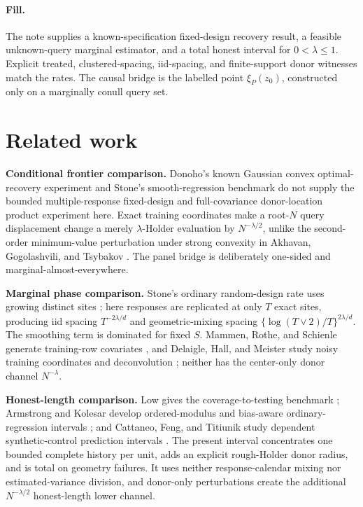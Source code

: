 \documentclass{article}
\begin{document}
\paragraph{Fill.} The note supplies a known-specification fixed-design recovery result, a feasible unknown-query marginal estimator, and a total honest interval for \(0<\lambda\le1\). Explicit treated, clustered-spacing, iid-spacing, and finite-support donor witnesses match the rates. The causal bridge is the labelled point \(\xi_P(z_0)\), constructed only on a marginally conull query set.

\section{Related work}

\textbf{Conditional frontier comparison.} Donoho's known Gaussian convex optimal-recovery experiment \cite{Donoho1994} and Stone's smooth-regression benchmark \cite{Stone1982} do not supply the bounded multiple-response fixed-design and full-covariance donor-location product experiment here. Exact training coordinates make a root-\(N\) query displacement change a merely \(\lambda\)-Holder evaluation by \(N^{-\lambda/2}\), unlike the second-order minimum-value perturbation under strong convexity in Akhavan, Gogolashvili, and Tsybakov \cite{AkhavanGogolashviliTsybakov2024}. The panel bridge is deliberately one-sided and marginal-almost-everywhere.

\textbf{Marginal phase comparison.} Stone's ordinary random-design rate uses growing distinct sites \cite{Stone1982}; here responses are replicated at only \(T\) exact sites, producing iid spacing \(T^{-2\lambda/d}\) and geometric-mixing spacing \(\{\log(T\vee2)/T\}^{2\lambda/d}\). The smoothing term is dominated for fixed \(S\). Mammen, Rothe, and Schienle generate training-row covariates \cite{MammenRotheSchienle2012}, and Delaigle, Hall, and Meister study noisy training coordinates and deconvolution \cite{DelaigleHallMeister2008}; neither has the center-only donor channel \(N^{-\lambda}\).

\textbf{Honest-length comparison.} Low gives the coverage-to-testing benchmark \cite{Low1997}; Armstrong and Kolesar develop ordered-modulus and bias-aware ordinary-regression intervals \cite{ArmstrongKolesar2018,ArmstrongKolesar2020}; and Cattaneo, Feng, and Titiunik study dependent synthetic-control prediction intervals \cite{CattaneoFengTitiunik2021}. The present interval concentrates one bounded complete history per unit, adds an explicit rough-Holder donor radius, and is total on geometry failures. It uses neither response-calendar mixing nor estimated-variance division, and donor-only perturbations create the additional \(N^{-\lambda/2}\) honest-length lower channel.
\end{document}
